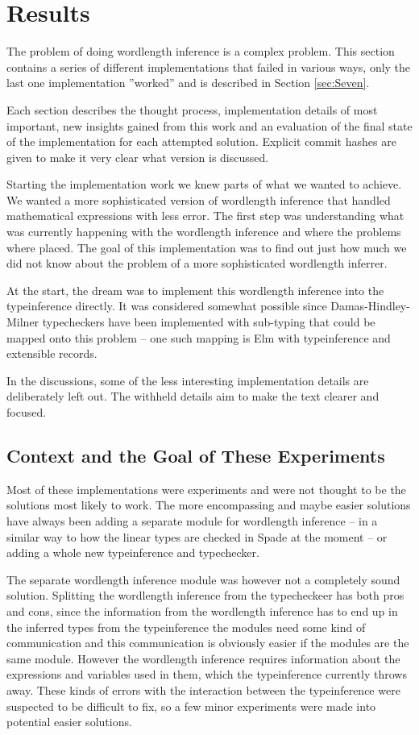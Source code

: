 \chapter{Results}
\label{cha:Results}
The problem of doing wordlength inference is a complex problem. This section contains a series of different implementations that failed in various ways, only the last one implementation ''worked'' and is described in Section \ref{sec:Seven}.

Each section describes the thought process, implementation details of most important, new insights gained from this work and an evaluation of the final state of the implementation for each attempted solution. Explicit commit hashes are given to make it very clear what version is discussed.

Starting the implementation work we knew parts of what we wanted to achieve. We wanted a more sophisticated version of wordlength inference that handled mathematical expressions with less error. The first step was understanding what was currently happening with the wordlength inference and where the problems where placed. The goal of this implementation was to find out just how much we did not know about the problem of a more sophisticated wordlength inferrer.

At the start, the dream was to implement this wordlength inference into the typeinference directly. It was considered somewhat possible since Damas-Hindley-Milner typecheckers have been implemented with sub-typing that could be mapped onto this problem -- one such mapping is Elm with typeinference and extensible records.

In the discussions, some of the less interesting implementation details are deliberately left out. The withheld details aim to make the text clearer and focused.

\section{Context and the Goal of These Experiments}
Most of these implementations were experiments and were not thought to be the solutions most likely to work. The more encompassing and maybe easier solutions have always been adding a separate module for wordlength inference -- in a similar way to how the linear types are checked in Spade at the moment -- or adding a whole new typeinference and typechecker.

The separate wordlength inference module was however not a completely sound solution. Splitting the wordlength inference from the typecheckeer has both pros and cons, since the information from the wordlength inference has to end up in the inferred types from the typeinference the modules need some kind of communication and this communication is obviously easier if the modules are the same module. However the wordlength inference requires information about the expressions and variables used in them, which the typeinference currently throws away. These kinds of errors with the interaction between the typeinference were suspected to be difficult to fix, so a few minor experiments were made into potential easier solutions.

